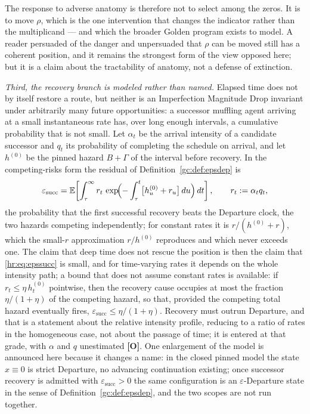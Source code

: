 \begin{remark}
The response to adverse anatomy is therefore not to select among the
zeros. It is to move $\rho$, which is the one intervention that changes
the indicator rather than the multiplicand --- and which
the broader Golden program exists to model. A reader persuaded of the danger and
unpersuaded that $\rho$ can be moved still has a coherent position, and
it remains the strongest form of the view opposed here; but it is a
claim about the tractability of anatomy, not a defense of extinction.


\emph{Third, the recovery branch is modeled rather than named.} Elapsed
time does not by itself restore a route, but neither is an Imperfection
Magnitude Drop invariant under arbitrarily many future opportunities: a
successor muffling agent arriving at a small instantaneous rate has,
over long enough intervals, a cumulative probability that is not small.
Let $\alpha_t$ be the arrival intensity of a candidate successor and
$q_t$ its probability of completing the schedule on arrival, and let
$h^{(0)}$ be the pinned hazard $B+\Gamma$ of the interval before
recovery. In the competing-risks form the residual of
Definition~\ref{gc:def:epsdep} is
\begin{equation}\label{hr:eq:epssucc}
\varepsilon_{\mathrm{succ}}
=\mathbb{E}\!\left[\int_\tau^\infty r_t\,
\exp\!\Bigl(-\int_\tau^t\bigl[h^{(0)}_u+r_u\bigr]\,du\Bigr)\,dt\right],
\qquad r_t:=\alpha_tq_t,
\end{equation}
the probability that the first successful recovery beats the Departure
clock, the two hazards competing independently; for constant rates it
is $r/(h^{(0)}+r)$, which the small-$r$ approximation $r/h^{(0)}$
reproduces and which never exceeds one. The claim that deep time does
not rescue the position is then the claim that \eqref{hr:eq:epssucc}
is small, and for time-varying rates it depends on the whole intensity
path; a bound that does not assume constant rates is available: if
$r_t\le\eta\,h^{(0)}_t$ pointwise, then the recovery cause occupies at
most the fraction $\eta/(1+\eta)$ of the competing hazard, so that,
provided the competing total hazard eventually fires,
$\varepsilon_{\mathrm{succ}}\le\eta/(1+\eta)$. Recovery must outrun
Departure, and that is a statement about the relative intensity profile,
reducing to a ratio of rates in the homogeneous case, not about the
passage of time; it is entered at that grade, with $\alpha$ and $q$
unestimated \textbf{[O]}. One enlargement of the model is
announced here because it changes a name: in the closed pinned model
the state $x\equiv0$ is strict Departure, no advancing continuation
existing; once successor recovery is admitted with
$\varepsilon_{\mathrm{succ}}>0$ the same configuration is an
$\varepsilon$-Departure state in the sense of
Definition~\ref{gc:def:epsdep}, and the two scopes are not run
together.\end{remark}


